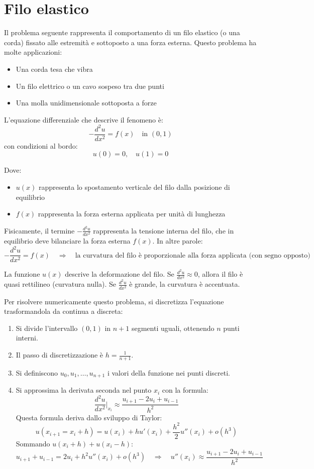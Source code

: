 \documentclass[12pt,a4paper]{article}
\begin{document}
\section*{Filo elastico}
Il problema seguente rappresenta il comportamento di un filo elastico (o una corda) fissato alle estremità e sottoposto a una forza esterna. Questo problema ha molte applicazioni:
\begin{itemize}
  \item Una corda tesa che vibra
  \item Un filo elettrico o un cavo sospeso tra due punti
  \item Una molla unidimensionale sottoposta a forze
\end{itemize}

L'equazione differenziale che descrive il fenomeno è:
\[
- \frac{d^2 u}{dx^2} = f(x) \quad \text{in } (0,1)
\]
con condizioni al bordo:
\[
u(0) = 0, \quad u(1) = 0
\]

Dove:
\begin{itemize}
  \item $u(x)$ rappresenta lo spostamento verticale del filo dalla posizione di equilibrio
  \item $f(x)$ rappresenta la forza esterna applicata per unità di lunghezza
\end{itemize}

Fisicamente, il termine $-\frac{d^2 u}{dx^2}$ rappresenta la tensione interna del filo, che in equilibrio deve bilanciare la forza esterna $f(x)$. In altre parole:
\[
- \frac{d^2 u}{dx^2} = f(x) \quad \Rightarrow \quad \text{la curvatura del filo è proporzionale alla forza applicata (con segno opposto)}
\]

La funzione $u(x)$ descrive la deformazione del filo. Se $\frac{d^2 u}{dx^2} \approx 0$, allora il filo è quasi rettilineo (curvatura nulla). Se $\frac{d^2 u}{dx^2}$ è grande, la curvatura è accentuata.

Per risolvere numericamente questo problema, si discretizza l'equazione trasformandola da continua a discreta:

\begin{enumerate}
  \item Si divide l'intervallo $(0,1)$ in $n+1$ segmenti uguali, ottenendo $n$ punti interni.
  \item Il passo di discretizzazione è $h = \frac{1}{n+1}$.
  \item Si definiscono $u_0, u_1, \dots, u_{n+1}$ i valori della funzione nei punti discreti.
  \item Si approssima la derivata seconda nel punto $x_i$ con la formula:
  \[
  \frac{d^2 u}{dx^2} \bigg|_{x_i} \approx \frac{u_{i+1} - 2u_i + u_{i-1}}{h^2}
  \]
  Questa formula deriva dallo sviluppo di Taylor:
  \[
  u(x_{i+1}=x_i +h) = u(x_i) +h u'(x_i) + \frac{h^2}{2} u''(x_i) + o(h^3)
  \]
  Sommando $u(x_i+h) + u(x_i-h)$:
  \[
  u_{i+1} + u_{i-1} = 2u_i + h^2 u''(x_i) + o(h^3) \quad \Rightarrow \quad u''(x_i) \approx \frac{u_{i+1} - 2u_i + u_{i-1}}{h^2}
  \]
\end{enumerate}
\end{document}
